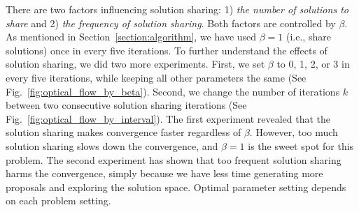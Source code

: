 There are two factors influencing solution sharing: 1) \textit{the
number of solutions to share} and 2) \textit{the frequency of solution
sharing}. Both factors are controlled by $\beta$. As mentioned in
Section~\ref{section:algorithm}, we have used $\beta = 1$ (i.e., share
solutions) once in every five iterations.  To further understand the
effects of solution sharing, we did two more experiments. First, we set
$\beta$ to 0, 1, 2, or 3 in every five iterations,
while keeping all other parameters the same (See
Fig.~\ref{fig:optical_flow_by_beta}).  Second, we change the number of
iterations $k$ between two consecutive solution sharing iterations
(See Fig.~\ref{fig:optical_flow_by_interval}).  The first experiment
revealed that the solution sharing makes convergence faster regardless of
$\beta$.  However, too much solution sharing slows down the convergence,
and $\beta=1$ is the sweet spot for this problem.
%
%
The second experiment has shown that too frequent solution sharing
harms the convergence, simply because we have less time generating more
proposals and exploring the solution space.
Optimal parameter setting depends on each problem setting.


